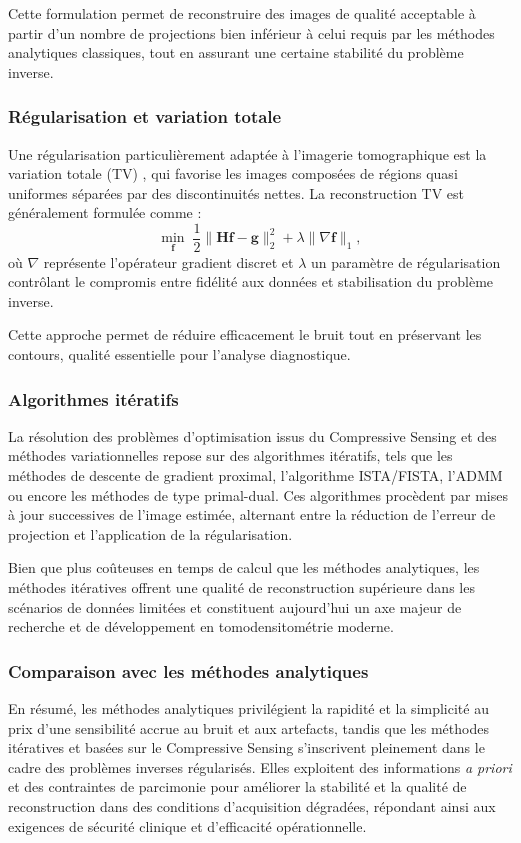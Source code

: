 Cette formulation permet de reconstruire des images de qualité acceptable à partir d'un
nombre de projections bien inférieur à celui requis par les méthodes analytiques classiques,
tout en assurant une certaine stabilité du problème inverse.

\subsubsection{Régularisation et variation totale}
Une régularisation particulièrement adaptée à l'imagerie tomographique est la variation
totale (TV) \cite{13}, qui favorise les images composées de régions quasi uniformes séparées par des
discontinuités nettes. La reconstruction TV est généralement formulée comme :
\begin{equation}
    \min_{\mathbf{f}} \;
    \frac{1}{2}\|\mathbf{H}\mathbf{f} - \mathbf{g}\|_2^2
    + \lambda \|\nabla \mathbf{f}\|_1,
\end{equation}
où $\nabla$ représente l'opérateur gradient discret et $\lambda$ un paramètre de
régularisation contrôlant le compromis entre fidélité aux données et stabilisation du
problème inverse.

Cette approche permet de réduire efficacement le bruit tout en préservant les contours,
qualité essentielle pour l'analyse diagnostique.

\subsubsection{Algorithmes itératifs}
La résolution des problèmes d'optimisation issus du Compressive Sensing et des méthodes
variationnelles repose sur des algorithmes itératifs, tels que les méthodes de descente de
gradient proximal, l'algorithme ISTA/FISTA, l'ADMM ou encore les méthodes de type primal-dual.
Ces algorithmes procèdent par mises à jour successives de l'image estimée, alternant entre la
réduction de l'erreur de projection et l'application de la régularisation.

Bien que plus coûteuses en temps de calcul que les méthodes analytiques, les méthodes
itératives offrent une qualité de reconstruction supérieure dans les scénarios de données
limitées et constituent aujourd'hui un axe majeur de recherche et de développement en
tomodensitométrie moderne.

\subsubsection{Comparaison avec les méthodes analytiques}
En résumé, les méthodes analytiques privilégient la rapidité et la simplicité au prix d'une
sensibilité accrue au bruit et aux artefacts, tandis que les méthodes itératives et basées sur
le Compressive Sensing s'inscrivent pleinement dans le cadre des problèmes inverses
régularisés. Elles exploitent des informations \emph{a priori} et des contraintes de parcimonie
pour améliorer la stabilité et la qualité de reconstruction dans des conditions d'acquisition
dégradées, répondant ainsi aux exigences de sécurité clinique et d'efficacité opérationnelle.


